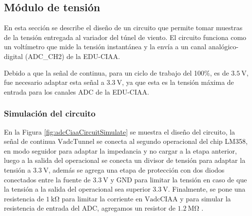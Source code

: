 \subsection{Módulo de tensión}\label{sec:adquisicionVadcTunel}

En esta sección se describe el diseño de un circuito que permite tomar muestras de la tensión entregada al variador del túnel de viento. El circuito funciona como un voltímetro que mide la tensión instantánea y la envía a un canal analógico-digital (ADC\_CH2) de la EDU-CIAA. 

Debido a que la señal de continua, para un ciclo de trabajo del 100\%, es de $\SI{3.5}{\volt}$, fue necesario adaptar esta señal a $\SI{3.3}{\volt}$, ya que esta es la tensión máxima de entrada para los canales ADC de la EDU-CIAA.

\subsubsection{Simulación del circuito}

En la Figura \ref{fig:adcCiaaCircuitSimulate} se muestra el diseño del circuito, la señal de continua $\text{VadcTunnel}$ se conecta al segundo operacional del chip LM358, en modo seguidor para adaptar la impedancia y no cargar a la etapa anterior, luego a la salida del operacional se conecta un divisor de tensión para adaptar la tensión a $\SI{3.3}{\volt}$, además se agrega una etapa de protección con dos diodos conectados entre la fuente de $\SI{3.3}{\volt}$ y GND para limitar la tensión en caso de que la tensión a la salida del operacional sea superior  $\SI{3.3}{\volt}$. Finalmente, se pone una resistencia de $\SI{1}{\kilo\ohm}$ para limitar la corriente en  $\text{VadcCIAA}$ y para simular la resistencia de entrada del ADC, agregamos un resistor de $\SI{1.2}{\mega\ohm}$ \cite{LPC435x_datasheet}.

